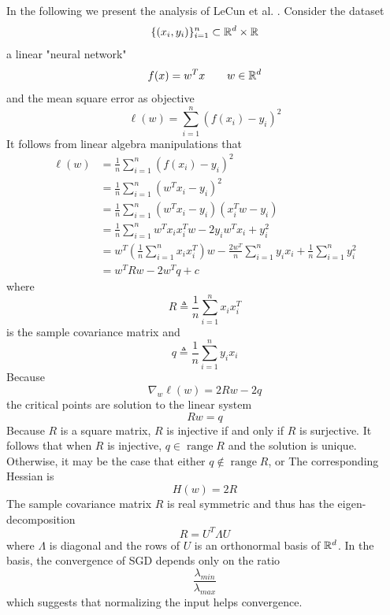 \documentclass{article}
\DeclareMathOperator{\range}{range}
\begin{document}
In the following we present the analysis of LeCun et al. \cite{le1991eigenvalues}.
Consider the dataset
\[
\{(x_i, y_i)\}_{i = 1}^n \subset {\mathbb R}^d \times {\mathbb R}
\]
a linear "neural network"
\[
f(x) = w^T x \qquad w \in {\mathbb R}^{d}
\]
and the mean square error as objective
\[
\ell (w) = \sum_{i = 1}^n (f(x_i) - y_i)^2
\]
It follows from linear algebra manipulations that
\begin{align*}
\ell (w)
& = \frac1n \sum_{i = 1}^n (f(x_i) - y_i)^2 \\
& = \frac1n \sum_{i = 1}^n (w^T x_i - y_i)^2 \\
& = \frac1n \sum_{i = 1}^n (w^T x_i - y_i) (x_i^T w - y_i) \\
& = \frac1n \sum_{i = 1}^n w^T x_i x_i^T w - 2 y_i w^T x_i + y_i^2 \\
& = w^T \left(\frac1n \sum_{i = 1}^n x_i x_i^T\right) w - \frac{2 w^T}n \sum_{i = 1}^n y_i x_i + \frac1n \sum_{i = 1}^n y_i^2 \\
& = w^T R w - 2 w^T q + c
\end{align*}
where
\[
R \triangleq \frac1n \sum_{i = 1}^n x_i x_i^T
\]
is the sample covariance matrix and
\[
q \triangleq \frac1n \sum_{i = 1}^n y_i x_i
\]
Because
\[
\nabla_w \ell (w) = 2 R w - 2 q
\]
the critical points are solution to the linear system
\[
R w = q
\]
Because $R$ is a square matrix, $R$ is injective if and only if $R$ is surjective.
It follows that when $R$ is injective, $q \in \range R$ and the solution is unique.
Otherwise, it may be the case that either $q \not \in \range R$, or
The corresponding Hessian is
\[
H (w) = 2 R
\]
The sample covariance matrix $R$ is real symmetric and thus has the eigen-decomposition
\[
R = U^T \Lambda U
\]
where $\Lambda$ is diagonal and the rows of $U$ is an orthonormal basis of ${\mathbb R}^d$.
In the basis, the convergence of SGD depends only on the ratio
\[
\frac{\lambda_{min}}{\lambda_{max}}
\]
which suggests that normalizing the input helps convergence.



\end{document}
